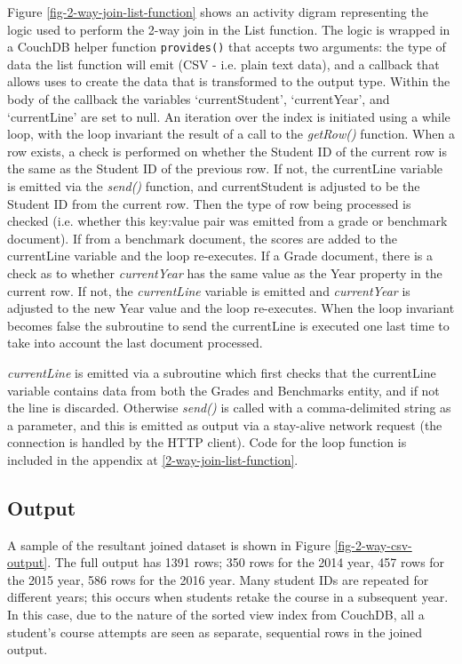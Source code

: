 Figure \ref{fig-2-way-join-list-function} shows an activity digram representing the logic used to perform the 2-way join in the List function. The logic is wrapped in a CouchDB helper function \texttt{provides()} that accepts two arguments: the type of data the list function will emit (CSV - i.e. plain text data), and a callback that allows uses to create the data that is transformed to the output type. Within the body of the callback the variables `currentStudent', `currentYear', and `currentLine' are set to null. An iteration over the index is initiated using a while loop, with the loop invariant the result of a call to the \textit{getRow()} function. When a row exists, a check is performed on whether the Student ID of the current row is the same as the Student ID of the previous row. If not, the currentLine variable is emitted via the \textit{send()} function, and currentStudent is adjusted to be the Student ID from the current row. Then the type of row being processed is checked (i.e. whether this key:value pair was emitted from a grade or benchmark document). If from a benchmark document, the scores are added to the currentLine variable and the loop re-executes. If a Grade document, there is a check as to whether \textit{currentYear} has the same value as the Year property in the current row. If not, the \textit{currentLine} variable is emitted and \textit{currentYear} is adjusted to the new Year value and the loop re-executes. When the loop invariant becomes false the subroutine to send the currentLine is executed one last time to take into account the last document processed.

\textit{currentLine} is emitted via a subroutine which first checks that the currentLine variable contains data from both the Grades and Benchmarks entity, and if not the line is discarded. Otherwise \textit{send()} is called with a comma-delimited string as a parameter, and this is emitted as output via a stay-alive network request (the connection is handled by the HTTP client). Code for the loop function is included in the appendix at \ref{2-way-join-list-function}.



\subsection{Output}
A sample of the resultant joined dataset is shown in Figure \ref{fig-2-way-csv-output}. The full output has 1391 rows; 350 rows for the 2014 year, 457 rows for the 2015 year, 586 rows for the 2016 year. Many student IDs are repeated for different years; this occurs when students retake the course in a subsequent year. In this case, due to the nature of the sorted view index from CouchDB, all a student's course attempts are seen as separate, sequential rows in the joined output.

